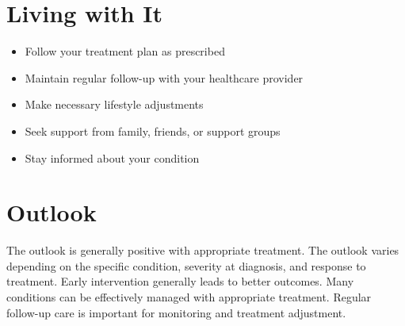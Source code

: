 \section{Living with It}
\begin{itemize}[noitemsep]
  \item Follow your treatment plan as prescribed
  \item Maintain regular follow-up with your healthcare provider
  \item Make necessary lifestyle adjustments
  \item Seek support from family, friends, or support groups
  \item Stay informed about your condition
\end{itemize}
\section{Outlook}
The outlook is generally positive with appropriate treatment. The outlook varies depending on the specific condition, severity at diagnosis, and response to treatment. Early intervention generally leads to better outcomes. Many conditions can be effectively managed with appropriate treatment. Regular follow-up care is important for monitoring and treatment adjustment.
